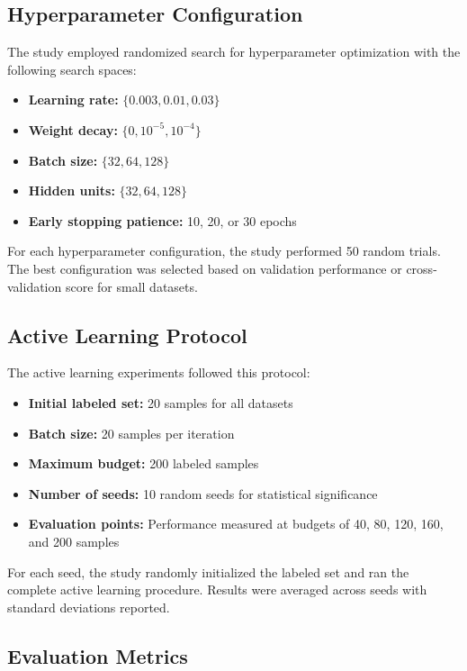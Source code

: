 \documentclass[conference]{IEEEtran}
\begin{document}
\subsection{Hyperparameter Configuration}

The study employed randomized search for hyperparameter optimization with the following search spaces:

\begin{itemize}
\item \textbf{Learning rate:} $\{0.003, 0.01, 0.03\}$
\item \textbf{Weight decay:} $\{0, 10^{-5}, 10^{-4}\}$
\item \textbf{Batch size:} $\{32, 64, 128\}$
\item \textbf{Hidden units:} $\{32, 64, 128\}$
\item \textbf{Early stopping patience:} 10, 20, or 30 epochs
\end{itemize}

For each hyperparameter configuration, the study performed 50 random trials. The best configuration was selected based on validation performance or cross-validation score for small datasets.

\subsection{Active Learning Protocol}

The active learning experiments followed this protocol:

\begin{itemize}
\item \textbf{Initial labeled set:} 20 samples for all datasets
\item \textbf{Batch size:} 20 samples per iteration
\item \textbf{Maximum budget:} 200 labeled samples
\item \textbf{Number of seeds:} 10 random seeds for statistical significance
\item \textbf{Evaluation points:} Performance measured at budgets of 40, 80, 120, 160, and 200 samples
\end{itemize}

For each seed, the study randomly initialized the labeled set and ran the complete active learning procedure. Results were averaged across seeds with standard deviations reported.

\subsection{Evaluation Metrics}
\end{document}
